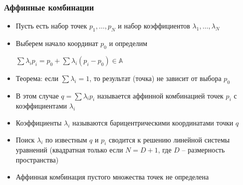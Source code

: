 \documentclass[10pt]{beamer}
\begin{document}
\begin{frame}[fragile]
\frametitle{Аффинные комбинации}
\begin{itemize}
\item Пусть есть набор точек \begin{math}p_1, \dots, p_N\end{math} и набор коэффициентов \begin{math}\lambda_1, \dots, \lambda_N\end{math}
\pause
\item Выберем начало координат \begin{math}p_0\end{math} и определим

\begin{math}\sum \lambda_i p_i = p_0 + \sum \lambda_i (p_i - p_0) \in \mathbb A\end{math}
\pause
\item Теорема: если \begin{math}\sum \lambda_i = 1\end{math}, то результат (точка) не зависит от выбора \begin{math}p_0\end{math}
\pause
\item В этом случае \begin{math}q = \sum \lambda_i p_i\end{math} называется аффинной комбинацией точек \begin{math}p_i\end{math} с коэффициентами \begin{math}\lambda_i\end{math}
\pause
\item Коэффициенты \begin{math}\lambda_i\end{math} называются барицентрическими координатами точки \begin{math}q\end{math}
\pause
\item Поиск \begin{math}\lambda_i\end{math} по известным \begin{math}q\end{math} и \begin{math}p_i\end{math} сводится к решению линейной системы уравнений (квадратная только если \begin{math}N = D + 1\end{math}, где \begin{math}D\end{math} -- размерность пространства)
\pause
\item Аффинная комбинация пустого множества точек не определена
\end{itemize}
\end{frame}
\end{document}
